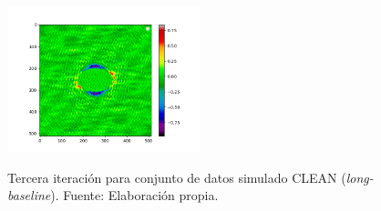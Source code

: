 \begin{figure}[!ht]
{   \label{fig:clean_residual_color_3iter}
    \includegraphics[width=0.5\textwidth]{images/sim_p2_long_color_residual.png}}
 \caption[Tercera iteración para conjunto de datos simulado CLEAN (\textit{long-baseline})]{Tercera iteración para conjunto de datos simulado CLEAN (\textit{long-baseline}). Fuente: Elaboración propia.}
 \label{fig:phasecal_3iter}
\end{figure}

